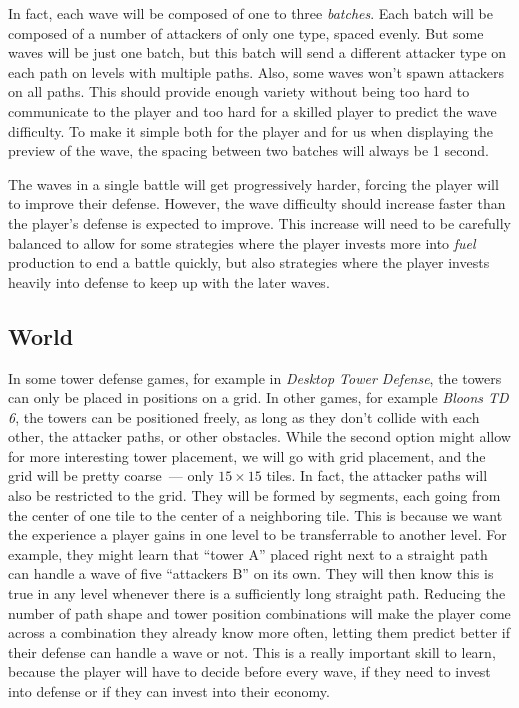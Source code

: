 In fact, each wave will be composed of one to three \emph{batches}.
Each batch will be composed of a number of attackers of only one type, spaced evenly.
But some waves will be just one batch, but this batch will send a different attacker type on each path on levels with multiple paths.
Also, some waves won't spawn attackers on all paths.
This should provide enough variety without being too hard to communicate to the player and too hard for a skilled player to predict the wave difficulty.
To make it simple both for the player and for us when displaying the preview of the wave, the spacing between two batches will always be 1 second.

The waves in a single battle will get progressively harder, forcing the player will to improve their defense.
However, the wave difficulty should increase faster than the player's defense is expected to improve.
This increase will need to be carefully balanced to allow for some strategies where the player invests more into \emph{fuel} production to end a battle quickly, but also strategies where the player invests heavily into defense to keep up with the later waves.

\subsection{World}\label{sec:design-world}

In some tower defense games, for example in \emph{Desktop Tower Defense}, the towers can only be placed in positions on a grid.
In other games, for example \emph{Bloons TD 6}, the towers can be positioned freely, as long as they don't collide with each other, the attacker paths, or other obstacles.
While the second option might allow for more interesting tower placement, we will go with grid placement, and the grid will be pretty coarse~--- only $15 \times 15$ tiles.
In fact, the attacker paths will also be restricted to the grid.
They will be formed by segments, each going from the center of one tile to the center of a neighboring tile.
This is because we want the experience a player gains in one level to be transferrable to another level.
For example, they might learn that \enquote{tower A} placed right next to a straight path can handle a wave of five \enquote{attackers B} on its own.
They will then know this is true in any level whenever there is a sufficiently long straight path.
Reducing the number of path shape and tower position combinations will make the player come across a combination they already know more often, letting them predict better if their defense can handle a wave or not.
This is a really important skill to learn, because the player will have to decide before every wave, if they need to invest into defense or if they can invest into their economy.

